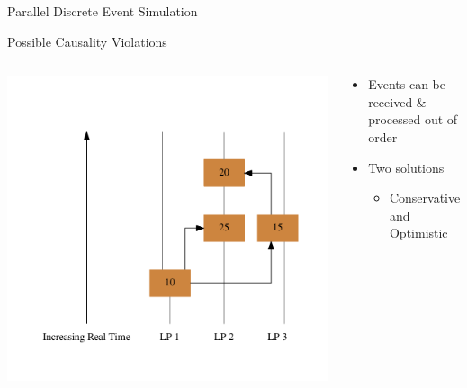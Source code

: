 \documentclass[10pt]{beamer}
\begin{document}
\begin{frame}{Parallel Discrete Event Simulation}
    \begin{block}{Possible Causality Violations}
        \begin{columns}[T]
        \begin{column}{0.4\textwidth}
            \includegraphics[width=\textwidth]{../figs/graphviz/causality.pdf}
        \end{column}
        \begin{column}{0.6\textwidth}
            \begin{itemize}
                \item Events can be received \& processed out of order
                \item Two solutions
                    \begin{itemize}
                        \item Conservative and Optimistic
                    \end{itemize}
            \end{itemize}
        \end{column}
    \end{columns}
    \end{block}

\end{frame}
\end{document}
